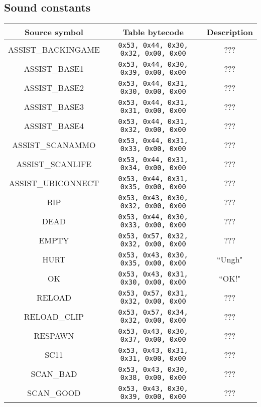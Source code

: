 \documentclass[12pt,a4paper]{scrbook}
\begin{document}
\subsection{Sound constants}
\label{sec:sndtab}
\begin{center}
  \begin{tabular}{ | c | c || c | }
    \hline
    Source symbol & Table bytecode & Description \\ \hline \hline
    ASSIST\_BACKINGAME & \texttt{0x53, 0x44, 0x30, 0x32, 0x00, 0x00} & ???  \\ \hline
    ASSIST\_BASE1 & \texttt{0x53, 0x44, 0x30, 0x39, 0x00, 0x00} & ???  \\ \hline
    ASSIST\_BASE2 & \texttt{0x53, 0x44, 0x31, 0x30, 0x00, 0x00} & ???  \\ \hline
    ASSIST\_BASE3 & \texttt{0x53, 0x44, 0x31, 0x31, 0x00, 0x00} & ???  \\ \hline
    ASSIST\_BASE4 & \texttt{0x53, 0x44, 0x31, 0x32, 0x00, 0x00} & ???  \\ \hline    
    ASSIST\_SCANAMMO & \texttt{0x53, 0x44, 0x31, 0x33, 0x00, 0x00} & ???  \\ \hline
    ASSIST\_SCANLIFE & \texttt{0x53, 0x44, 0x31, 0x34, 0x00, 0x00} & ???  \\ \hline
    ASSIST\_UBICONNECT & \texttt{0x53, 0x44, 0x31, 0x35, 0x00, 0x00} & ???  \\ \hline
    BIP & \texttt{0x53, 0x43, 0x30, 0x32, 0x00, 0x00} & ???  \\ \hline
    DEAD & \texttt{0x53, 0x44, 0x30, 0x33, 0x00, 0x00}  & ???  \\ \hline
    EMPTY & \texttt{0x53, 0x57, 0x32, 0x32, 0x00, 0x00} & ???  \\ \hline
    HURT & \texttt{0x53, 0x43, 0x30, 0x35, 0x00, 0x00} & ``Ungh"  \\ \hline
	OK & \texttt{0x53, 0x43, 0x31, 0x30, 0x00, 0x00} & ``OK!"  \\ \hline	
    RELOAD & \texttt{0x53, 0x57, 0x31, 0x32, 0x00, 0x00} & ???  \\ \hline
	RELOAD\_CLIP & \texttt{0x53, 0x57, 0x34, 0x32, 0x00, 0x00} & ???  \\ \hline
	RESPAWN & \texttt{0x53, 0x43, 0x30, 0x37, 0x00, 0x00} & ???  \\ \hline	
	SC11 & \texttt{0x53, 0x43, 0x31, 0x31, 0x00, 0x00} & ???  \\ \hline      
	SCAN\_BAD & \texttt{0x53, 0x43, 0x30, 0x38, 0x00, 0x00} & ???  \\ \hline
    SCAN\_GOOD & \texttt{0x53, 0x43, 0x30, 0x39, 0x00, 0x00} & ???  \\ \hline

\end{tabular}
\end{center}
\end{document}
